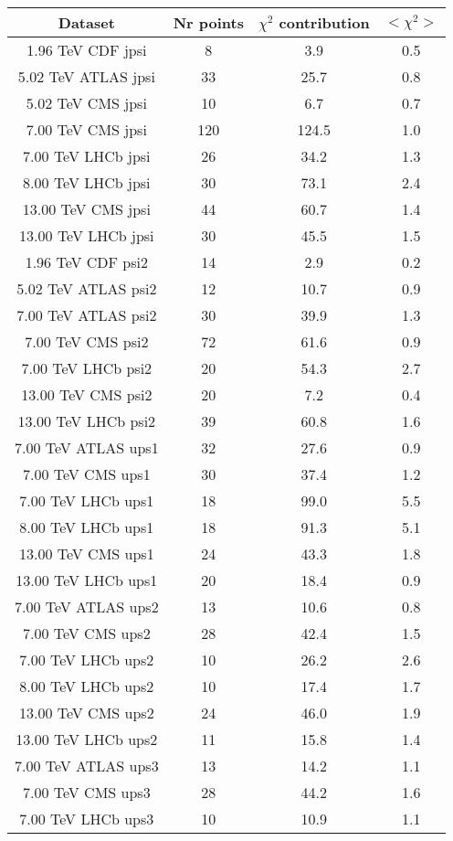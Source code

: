 \begin{table}[h!]
\centering
\begin{tabular}{c|c|c|c}
Dataset & Nr points & $\chi^2$ contribution & $<\chi^2>$ \\
\hline
1.96 TeV CDF jpsi & 8 & 3.9 & 0.5 \\
5.02 TeV ATLAS jpsi & 33 & 25.7 & 0.8 \\
5.02 TeV CMS jpsi & 10 & 6.7 & 0.7 \\
7.00 TeV CMS jpsi & 120 & 124.5 & 1.0 \\
7.00 TeV LHCb jpsi & 26 & 34.2 & 1.3 \\
8.00 TeV LHCb jpsi & 30 & 73.1 & 2.4 \\
13.00 TeV CMS jpsi & 44 & 60.7 & 1.4 \\
13.00 TeV LHCb jpsi & 30 & 45.5 & 1.5 \\
1.96 TeV CDF psi2 & 14 & 2.9 & 0.2 \\
5.02 TeV ATLAS psi2 & 12 & 10.7 & 0.9 \\
7.00 TeV ATLAS psi2 & 30 & 39.9 & 1.3 \\
7.00 TeV CMS psi2 & 72 & 61.6 & 0.9 \\
7.00 TeV LHCb psi2 & 20 & 54.3 & 2.7 \\
13.00 TeV CMS psi2 & 20 & 7.2 & 0.4 \\
13.00 TeV LHCb psi2 & 39 & 60.8 & 1.6 \\
7.00 TeV ATLAS ups1 & 32 & 27.6 & 0.9 \\
7.00 TeV CMS ups1 & 30 & 37.4 & 1.2 \\
7.00 TeV LHCb ups1 & 18 & 99.0 & 5.5 \\
8.00 TeV LHCb ups1 & 18 & 91.3 & 5.1 \\
13.00 TeV CMS ups1 & 24 & 43.3 & 1.8 \\
13.00 TeV LHCb ups1 & 20 & 18.4 & 0.9 \\
7.00 TeV ATLAS ups2 & 13 & 10.6 & 0.8 \\
7.00 TeV CMS ups2 & 28 & 42.4 & 1.5 \\
7.00 TeV LHCb ups2 & 10 & 26.2 & 2.6 \\
8.00 TeV LHCb ups2 & 10 & 17.4 & 1.7 \\
13.00 TeV CMS ups2 & 24 & 46.0 & 1.9 \\
13.00 TeV LHCb ups2 & 11 & 15.8 & 1.4 \\
7.00 TeV ATLAS ups3 & 13 & 14.2 & 1.1 \\
7.00 TeV CMS ups3 & 28 & 44.2 & 1.6 \\
7.00 TeV LHCb ups3 & 10 & 10.9 & 1.1 \\

\end{tabular}
\end{table}
